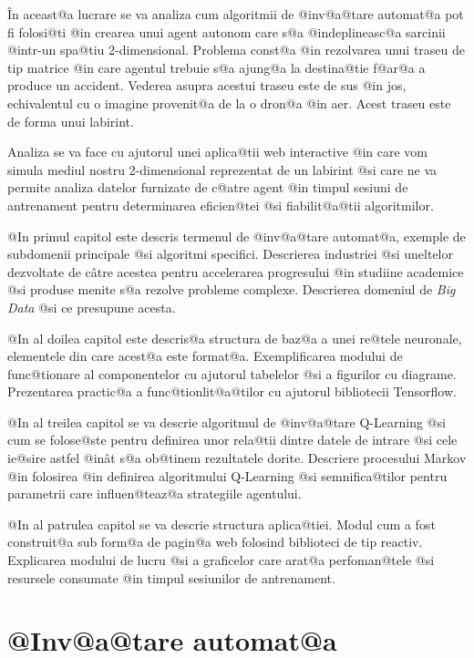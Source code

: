 \^ In aceast@a lucrare se va analiza cum algoritmii de @inv@a@tare automat@a  pot fi folosi@ti @in crearea unui agent autonom care s@a @indeplineasc@a sarcinii @intr-un spa@tiu 2-dimensional. Problema const@a @in rezolvarea unui traseu de tip matrice @in care agentul trebuie s@a ajung@a la destina@tie f@ar@a a produce un accident. Vederea asupra acestui traseu este de sus @in jos, echivalentul cu o imagine provenit@a de la o dron@a @in aer. Acest traseu este de forma unui labirint.  

Analiza se va face cu ajutorul unei aplica@tii web interactive @in care vom simula mediul nostru 2-dimensional reprezentat de un labirint @si care ne va permite analiza datelor furnizate de c@atre agent @in timpul sesiuni de antrenament pentru determinarea eficien@tei @si fiabilit@a@tii algoritmilor.


\hspace{0.2cm}

@In primul capitol este descris termenul de @inv@a@tare automat@a, exemple de subdomenii principale @si algoritmi specifici. Descrierea industriei @si uneltelor dezvoltate de c\^ atre acestea pentru accelerarea progresului @in studiine academice @si produse menite s@a rezolve probleme complexe. Descrierea domeniul de \textsl{Big Data} @si ce presupune acesta.

@In al doilea capitol este descris@a structura de baz@a a unei re@tele neuronale, elementele din care acest@a este format@a. Exemplificarea modului de func@tionare al componentelor cu ajutorul tabelelor @si a figurilor cu diagrame. Prezentarea practic@a a func@tionlit@a@tilor cu ajutorul bibliotecii Tensorflow.

@In al treilea capitol se va descrie algoritmul de @inv@a@tare Q-Learning @si cum se folose@ste pentru definirea unor rela@tii dintre datele de intrare @si cele ie@sire astfel @in\^ at s@a ob@tinem rezultatele dorite. Descriere procesului Markov @in folosirea @in definirea algoritmului Q-Learning @si semnifica@tilor pentru parametrii care influen@teaz@a strategiile agentului.

@In al patrulea capitol se va descrie structura aplica@tiei. Modul cum a fost construit@a sub form@a de pagin@a web folosind biblioteci de tip reactiv. Explicarea modului de lucru @si a graficelor care arat@a perfoman@tele @si resursele consumate @in timpul sesiunilor de antrenament.

\newpage

\chapter{ @Inv@a@tare automat@a }

